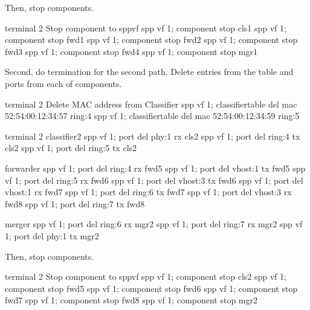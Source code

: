 \documentclass[a4paper,11pt,openany,oneside,english]{sphinxmanual}
\begin{document}
Then, stop components.

\begin{sphinxVerbatim}[commandchars=\\\{\},formatcom=\footnotesize]
\PYGZsh{} terminal 2
\PYGZsh{} Stop component to spp\PYGZus{}vf
spp \PYGZgt{} vf 1; component stop cls1
spp \PYGZgt{} vf 1; component stop fwd1
spp \PYGZgt{} vf 1; component stop fwd2
spp \PYGZgt{} vf 1; component stop fwd3
spp \PYGZgt{} vf 1; component stop fwd4
spp \PYGZgt{} vf 1; component stop mgr1
\end{sphinxVerbatim}

Second, do termination for the second path.
Delete entries from the table and ports from each of components.

\begin{sphinxVerbatim}[commandchars=\\\{\},formatcom=\footnotesize]
\PYGZsh{} terminal 2
\PYGZsh{} Delete MAC address from Classifier
spp \PYGZgt{} vf 1; classifier\PYGZus{}table del mac 52:54:00:12:34:57 ring:4
spp \PYGZgt{} vf 1; classifier\PYGZus{}table del mac 52:54:00:12:34:59 ring:5
\end{sphinxVerbatim}

\begin{sphinxVerbatim}[commandchars=\\\{\},formatcom=\footnotesize]
\PYGZsh{} terminal 2
\PYGZsh{} classifier2
spp \PYGZgt{} vf 1; port del phy:1 rx cls2
spp \PYGZgt{} vf 1; port del ring:4 tx cls2
spp \PYGZgt{} vf 1; port del ring:5 tx cls2

\PYGZsh{} forwarder
spp \PYGZgt{} vf 1; port del ring:4 rx fwd5
spp \PYGZgt{} vf 1; port del vhost:1 tx fwd5
spp \PYGZgt{} vf 1; port del ring:5 rx fwd6
spp \PYGZgt{} vf 1; port del vhost:3 tx fwd6
spp \PYGZgt{} vf 1; port del vhost:1 rx fwd7
spp \PYGZgt{} vf 1; port del ring:6 tx fwd7
spp \PYGZgt{} vf 1; port del vhost:3 rx fwd8
spp \PYGZgt{} vf 1; port del ring:7 tx fwd8

\PYGZsh{} merger
spp \PYGZgt{} vf 1; port del ring:6 rx mgr2
spp \PYGZgt{} vf 1; port del ring:7 rx mgr2
spp \PYGZgt{} vf 1; port del phy:1 tx mgr2
\end{sphinxVerbatim}

Then, stop components.

\begin{sphinxVerbatim}[commandchars=\\\{\},formatcom=\footnotesize]
\PYGZsh{} terminal 2
\PYGZsh{} Stop component to spp\PYGZus{}vf
spp \PYGZgt{} vf 1; component stop cls2
spp \PYGZgt{} vf 1; component stop fwd5
spp \PYGZgt{} vf 1; component stop fwd6
spp \PYGZgt{} vf 1; component stop fwd7
spp \PYGZgt{} vf 1; component stop fwd8
spp \PYGZgt{} vf 1; component stop mgr2
\end{sphinxVerbatim}
\end{document}
